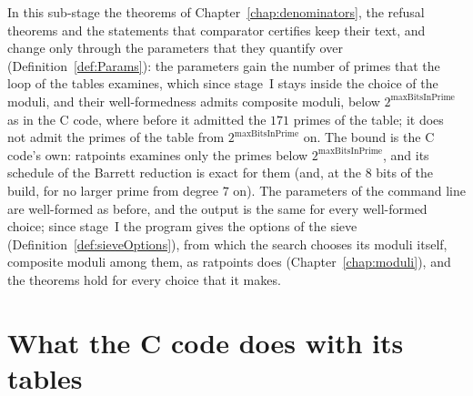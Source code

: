 In this sub-stage the theorems of Chapter~\ref{chap:denominators}, the refusal theorems and the
statements that comparator certifies keep their text, and change only through the parameters that
they quantify over (Definition~\ref{def:Params}): the parameters gain the number of primes that the
loop of the tables examines, which since stage~I stays inside the choice of the moduli, and their
well-formedness admits composite moduli, below $2^{\mathrm{maxBitsInPrime}}$ as in the C code, where
before it admitted the $171$ primes of the table; it does not admit the primes of the table from
$2^{\mathrm{maxBitsInPrime}}$ on. The bound is the C code's own: ratpoints examines only the primes
below $2^{\mathrm{maxBitsInPrime}}$, and its schedule of the Barrett reduction is exact for them
(and, at the $8$ bits of the build, for no larger prime from degree $7$ on). The parameters of the
command line are well-formed as before, and the output is the same for every well-formed choice;
since stage~I the program gives the options of the sieve (Definition~\ref{def:sieveOptions}), from
which the search chooses its moduli itself, composite moduli among them, as ratpoints does
(Chapter~\ref{chap:moduli}), and the theorems hold for every choice that it makes.

\section{What the C code does with its tables}\label{sec:tablesC}

